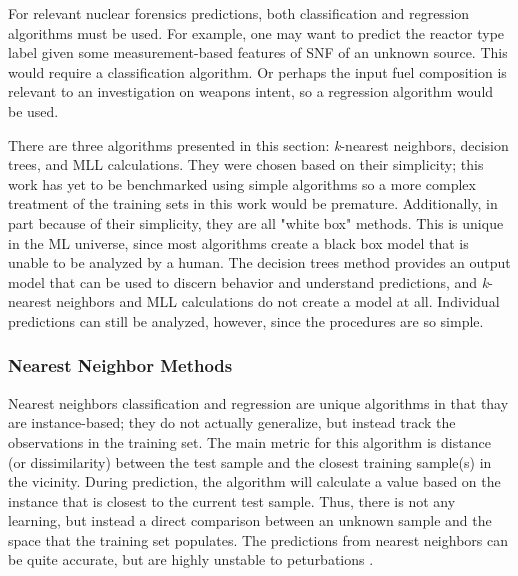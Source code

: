 
For relevant nuclear forensics predictions, both classification and regression
algorithms must be used.  For example, one may want to predict the reactor type
label given some measurement-based features of \gls{SNF} of an unknown source.
This would require a classification algorithm. Or perhaps the input fuel
composition is relevant to an investigation on weapons intent, so a regression
algorithm would be used. 

There are three algorithms presented in this section: \textit{k}-nearest
neighbors, decision trees, and \gls{MLL} calculations. They were chosen based
on their simplicity; this work has yet to be benchmarked using simple
algorithms so a more complex treatment of the training sets in this work would
be premature. Additionally, in part because of their simplicity, they are all
"white box" methods.  This is unique in the \gls{ML} universe, since most
algorithms create a black box model that is unable to be analyzed by a human.
The  decision trees method provides an output model that can be used to discern
behavior and understand predictions, and \textit{k}-nearest neighbors and
\gls{MLL} calculations do not create a model at all. Individual predictions can
still be analyzed, however, since the procedures are so simple. 

\subsubsection{Nearest Neighbor Methods}

Nearest neighbors classification and regression are unique algorithms in
that thay are instance-based; they do not actually generalize, but instead
track the observations in the training set.  The main metric for this algorithm
is distance (or dissimilarity) between the test sample and the closest training
sample(s) in the vicinity.  During prediction, the algorithm will calculate a
value based on the instance that is closest to the current test sample. Thus,
there is not any learning, but instead a direct comparison between an unknown
sample and the space that the training set populates. The predictions from
nearest neighbors can be quite accurate, but are highly unstable to
peturbations \cite{elements_stats}.

